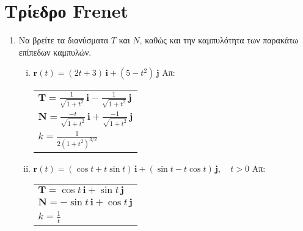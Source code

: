 \section*{Τρίεδρο Frenet}

\begin{enumerate}
  \item Να βρείτε τα διανύσματα $ T $ και $N$, καθώς και την καμπυλότητα των παρακάτω 
    επίπεδων καμπυλών.
    \begin{enumerate}[i)]
      \item $ \mathbf{r}(t)=(2t+3)\, \mathbf{i} + (5-t^{2})\, \mathbf{j} $ 
        \hfill Απ: \begin{tabular}{l}
          $ \mathbf{T} =  \frac{1}{\sqrt{1+t^{2}}}\,\mathbf{i} -
          \frac{1}{\sqrt{1+t^{2}}}\,\mathbf{j} $
          \\
          $ \mathbf{N}=  \frac{-t}{\sqrt{1+t^{2}}}\,\mathbf{i} + 
          \frac{-1}{\sqrt{1+t^{2}}} \,\mathbf{j} $ \\
        $ k= \frac{1}{2(1+t^{2})^{3/2}} $ 
        \end{tabular} 
      \item $ \mathbf{r}(t)=(\cos{t} + t \sin{t})\, \mathbf{i} + (\sin{t} - t
        \cos{t})\, \mathbf{j} , \quad t>0 $
        \hfill Απ: \begin{tabular}{l}
          $ \mathbf{T}=  \cos{t}\,\mathbf{i} + \sin{t}\,\mathbf{j} $ \\
          $ \mathbf{N}=  - \sin{t}\,\mathbf{i} + \cos{t}\,\mathbf{j} $ \\
          $ k = \frac{1}{t} $
        \end{tabular} 
    \end{enumerate}


\end{enumerate}
